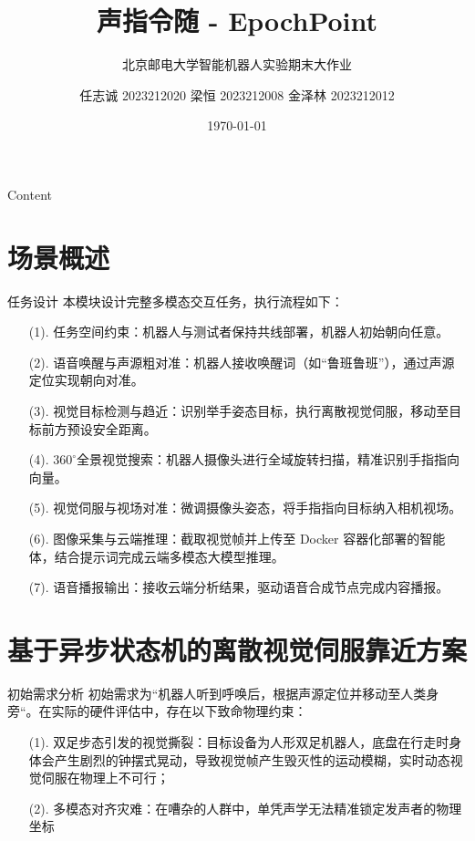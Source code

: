 \documentclass{beamer}
\title{声指令随 - EpochPoint}
\subtitle{北京邮电大学智能机器人实验期末大作业}
\author[BUPT]{
  任志诚 2023212020
  梁恒 2023212008
  金泽林 2023212012
}
\institute[]{BUPT}
\date{\today}
\begin{document}
    \begin{frame}
        \titlepage
    \end{frame}

    \begin{frame}{Content}
        \tableofcontents
    \end{frame}

    \section{场景概述}
    \begin{frame}{任务设计}
    本模块设计完整多模态交互任务，执行流程如下：
        \begin{enumerate}
            \item[(1).] 任务空间约束：机器人与测试者保持共线部署，机器人初始朝向任意。
            \item[(2).] 语音唤醒与声源粗对准：机器人接收唤醒词（如“鲁班鲁班”），通过声源定位实现朝向对准。
            \item[(3).] 视觉目标检测与趋近：识别举手姿态目标，执行离散视觉伺服，移动至目标前方预设安全距离。
            \item[(4).] $360^\circ$全景视觉搜索：机器人摄像头进行全域旋转扫描，精准识别手指指向向量。
            \item[(5).] 视觉伺服与视场对准：微调摄像头姿态，将手指指向目标纳入相机视场。
            \item[(6).] 图像采集与云端推理：截取视觉帧并上传至 Docker 容器化部署的智能体，结合提示词完成云端多模态大模型推理。
            \item[(7).] 语音播报输出：接收云端分析结果，驱动语音合成节点完成内容播报。
        \end{enumerate}
    \end{frame}
    \section{基于异步状态机的离散视觉伺服靠近方案}

    \begin{frame}{初始需求分析}
        初始需求为“机器人听到呼唤后，根据声源定位并移动至人类身旁“。在实际的硬件评估中，存在以下致命物理约束：
        \begin{enumerate}
            \item[(1).] 双足步态引发的视觉撕裂：目标设备为人形双足机器人，底盘在行走时身体会产生剧烈的钟摆式晃动，导致视觉帧产生毁灭性的运动模糊，实时动态视觉伺服在物理上不可行；
            \item[(2).] 多模态对齐灾难：在嘈杂的人群中，单凭声学无法精准锁定发声者的物理坐标
        \end{enumerate}    
    \end{frame}
\end{document}
